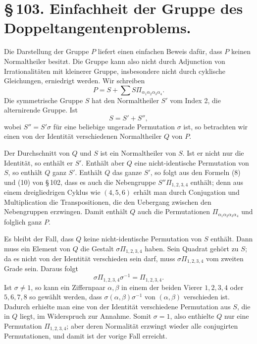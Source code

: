 \documentclass[11pt]{article}
\begin{document}
\section*{\S\,103. Einfachheit der Gruppe des Doppeltangentenproblems.}

Die Darstellung der Gruppe \(P\) liefert einen einfachen Beweis dafür, dass \(P\) keinen Normaltheiler besitzt. Die Gruppe kann also nicht durch Adjunction von Irrationalitäten mit kleinerer Gruppe, insbesondere nicht durch cyklische Gleichungen, erniedrigt werden. Wir schreiben
\begin{equation}
 P=S+\sum S\Pi_{\alpha_1\alpha_2\alpha_3\alpha_4}. \tag{1}
\end{equation}
Die symmetrische Gruppe \(S\) hat den Normaltheiler \(S'\) vom Index 2, die alternirende Gruppe. Ist
\begin{equation}
 S=S'+S'', \tag{2}
\end{equation}
wobei \(S''=S'\sigma\) für eine beliebige ungerade Permutation \(\sigma\) ist, so betrachten wir einen von der Identität verschiedenen Normaltheiler \(Q\) von \(P\).

Der Durchschnitt von \(Q\) und \(S\) ist ein Normaltheiler von \(S\). Ist er nicht nur die Identität, so enthält er \(S'\). Enthält aber \(Q\) eine nicht-identische Permutation von \(S\), so enthält \(Q\) ganz \(S'\). Enthält \(Q\) das ganze \(S'\), so folgt aus den Formeln (8) und (10) von \S\,102, dass es auch die Nebengruppe \(S''\Pi_{1,2,3,4}\) enthält; denn aus einem dreigliedrigen Cyklus wie \((4,5,6)\) erhält man durch Conjugation und Multiplication die Transpositionen, die den Uebergang zwischen den Nebengruppen erzwingen. Damit enthält \(Q\) auch die Permutationen \(\Pi_{\alpha_1\alpha_2\alpha_3\alpha_4}\) und folglich ganz \(P\).

Es bleibt der Fall, dass \(Q\) keine nicht-identische Permutation von \(S\) enthält. Dann muss ein Element von \(Q\) die Gestalt \(\sigma\Pi_{1,2,3,4}\) haben. Sein Quadrat gehört zu \(S\); da es nicht von der Identität verschieden sein darf, muss \(\sigma\Pi_{1,2,3,4}\) vom zweiten Grade sein. Daraus folgt
\[
 \sigma\Pi_{1,2,3,4}\sigma^{-1}=\Pi_{1,2,3,4}.
\]
Ist \(\sigma\ne 1\), so kann ein Ziffernpaar \(\alpha,\beta\) in einem der beiden Vierer \(1,2,3,4\) oder \(5,6,7,8\) so gewählt werden, dass \(\sigma(\alpha,\beta)\sigma^{-1}\) von \((\alpha,\beta)\) verschieden ist. Dadurch erhielte man eine von der Identität verschiedene Permutation aus \(S\), die in \(Q\) liegt, im Widerspruch zur Annahme. Somit \(\sigma=1\), also enthielte \(Q\) nur eine Permutation \(\Pi_{1,2,3,4}\); aber deren Normalität erzwingt wieder alle conjugirten Permutationen, und damit ist der vorige Fall erreicht.
\end{document}
